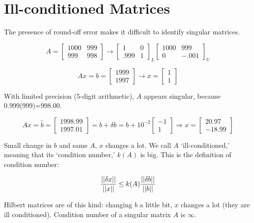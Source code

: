\documentclass[12pt]{article}
\newcommand{\norm}[1]{\left|\left|#1\right|\right|}
\newcommand{\<}{\langle}
\renewcommand{\>}{\rangle}
\begin{document}
\section{Ill-conditioned Matrices}

The presence of round-off error makes it difficult to identify singular matrices.

\[
	A =
	\begin{bmatrix}
		1000 & 999 \\ 999 & 998		
	\end{bmatrix}	
	\rightarrow
	\begin{bmatrix}
		1 & 0 \\ .999 & 1
	\end{bmatrix}_L
	\begin{bmatrix}
		1000 & 999 \\
		0 & -.001
	\end{bmatrix}_U
\]


\[
	Ax = b = \begin{bmatrix} 1999 \\ 1997 \end{bmatrix}
	\rightarrow
	x = \begin{bmatrix} 1 \\ 1 \end{bmatrix}
\]

With limited precision (5-digit arithmetic), $A$ appears singular, because 0.999(999)=998.00.

\[
	Ax = \hat{b} = \begin{bmatrix} 1998.99 \\ 1997.01 \end{bmatrix} =
	b + \delta b = b + 10^{-2} \begin{bmatrix} -1 \\ 1 \end{bmatrix}
	\Rightarrow
	x = \begin{bmatrix} 20.97 \\ -18.99 \end{bmatrix}
\]

Small change in $b$ and same $A$, $x$ changes a lot. We call $A$ `ill-conditioned,' meaning that its `condition number,' $k(A)$ is big. This is the definition of condition number:

\[
	{\norm{\delta x} \over \norm{x}} \leq k(A) {\norm{\delta b} \over \norm{b}}
\]

Hilbert matrices are of this kind: changing $b$ a little bit, $x$ changes a lot (they are ill conditioned). Condition number of a singular matrix $A$ is $\infty$.
\end{document}
